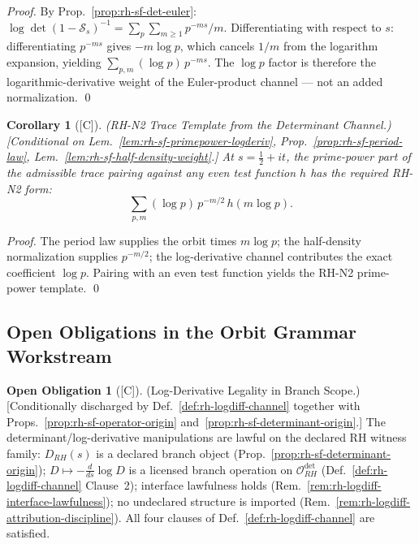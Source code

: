 \documentclass[12pt,oneside]{amsbook}
\theoremstyle{plain}
\newtheorem{corollary}[theorem]{Corollary}
\theoremstyle{definition}
\newtheorem{obligation}[theorem]{Open Obligation}
\theoremstyle{remark}
\newcommand{\status}[1]{\textup{[#1]}}
\begin{document}
\begin{proof}
By Prop.~\ref{prop:rh-sf-det-euler}: $\log\det(1-\mathcal{S}_s)^{-1}
= \sum_p \sum_{m\geq 1} p^{-ms}/m$. Differentiating with respect to
$s$: differentiating $p^{-ms}$ gives $-m\log p$, which cancels $1/m$
from the logarithm expansion, yielding $\sum_{p,m} (\log p)\,p^{-ms}$.
The $\log p$ factor is therefore the logarithmic-derivative weight of
the Euler-product channel --- not an added normalization. \qed
\end{proof}

\begin{corollary}[\status{C}]\label{cor:rh-sf-logp-template}
\textup{(RH-N2 Trace Template from the Determinant Channel.)}
\textup{[Conditional on Lem.~\ref{lem:rh-sf-primepower-logderiv},
Prop.~\ref{prop:rh-sf-period-law}, Lem.~\ref{lem:rh-sf-half-density-weight}.]}
At $s = \tfrac{1}{2}+it$, the prime-power part of the admissible
trace pairing against any even test function $h$ has the required
RH-N2 form:
\[
 \sum_{p,m} (\log p)\,p^{-m/2}\,h(m\log p).
\]
\end{corollary}

\begin{proof}
The period law supplies the orbit times $m\log p$; the half-density
normalization supplies $p^{-m/2}$; the log-derivative channel
contributes the exact coefficient $\log p$. Pairing with an even
test function yields the RH-N2 prime-power template. \qed
\end{proof}

\subsection{Open Obligations in the Orbit Grammar Workstream}

\begin{obligation}[\status{C}]\label{ob:rh-sf-logderiv-legality}
\textup{(Log-Derivative Legality in Branch Scope.)}
\textup{[Conditionally discharged by Def.~\ref{def:rh-logdiff-channel}
together with Props.~\ref{prop:rh-sf-operator-origin}
and~\ref{prop:rh-sf-determinant-origin}.]}
The determinant/log-derivative manipulations are lawful on the
declared RH witness family: $D_{RH}(s)$ is a declared branch object
(Prop.~\ref{prop:rh-sf-determinant-origin}); $D \mapsto
-\tfrac{d}{ds}\log D$ is a licensed branch operation on
$\mathcal{O}_{RH}^{\det}$ (Def.~\ref{def:rh-logdiff-channel}
Clause~2); interface lawfulness holds
(Rem.~\ref{rem:rh-logdiff-interface-lawfulness}); no undeclared
structure is imported
(Rem.~\ref{rem:rh-logdiff-attribution-discipline}).
All four clauses of Def.~\ref{def:rh-logdiff-channel} are satisfied.
\end{obligation}
\end{document}
